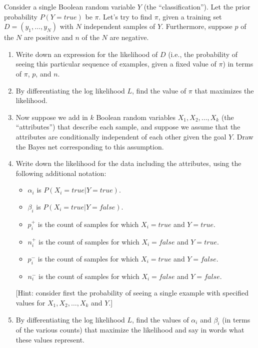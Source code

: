 \documentclass[cn,12pt]{homework}
\begin{document}
\begin{problem}
Consider a single Boolean random variable $Y$ (the ``classification''). Let the prior probability $P(Y=true)$ be $\pi$. Let's try to find $\pi$, given a training set $D = (y_1, \ldots, y_N)$ with $N$ independent samples of $Y$. Furthermore, suppose $p$ of the $N$ are positive and $n$ of the $N$ are negative.

\begin{enumerate}
    \item Write down an expression for the likelihood of $D$ (i.e., the probability of seeing this particular sequence of examples, given a fixed value of $\pi$) in terms of $\pi$, $p$, and $n$.
    \item By differentiating the log likelihood $L$, find the value of $\pi$ that maximizes the likelihood.
    \item Now suppose we add in $k$ Boolean random variables $X_1, X_2, \ldots, X_k$ (the ``attributes'') that describe each sample, and suppose we assume that the attributes are conditionally independent of each other given the goal $Y$. Draw the Bayes net corresponding to this assumption.
    \item Write down the likelihood for the data including the attributes, using the following additional notation:
    \begin{itemize}
        \item $\alpha_i$ is $P(X_i=true|Y=true)$.
        \item $\beta_i$ is $P(X_i=true|Y=false)$.
        \item $p_i^+$ is the count of samples for which $X_i=true$ and $Y=true$.
        \item $n_i^+$ is the count of samples for which $X_i=false$ and $Y=true$.
        \item $p_i^-$ is the count of samples for which $X_i=true$ and $Y=false$.
        \item $n_i^-$ is the count of samples for which $X_i=false$ and $Y=false$.
    \end{itemize}
    [Hint: consider first the probability of seeing a single example with specified values for $X_1, X_2, \ldots, X_k$ and $Y$.]
    \item By differentiating the log likelihood $L$, find the values of $\alpha_i$ and $\beta_i$ (in terms of the various counts) that maximize the likelihood and say in words what these values represent.
\end{enumerate}



\end{problem}
\end{document}
